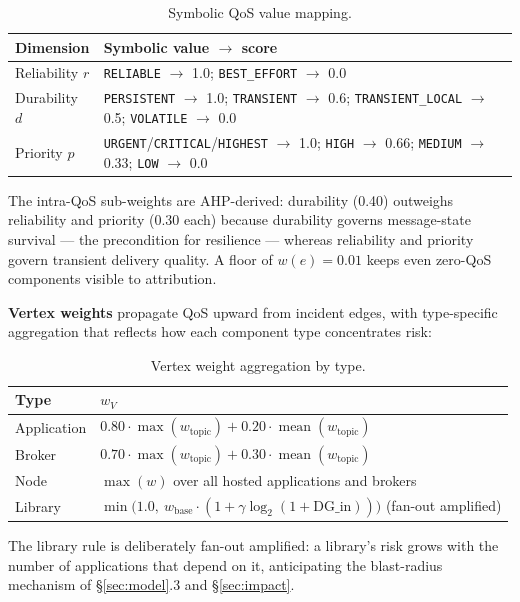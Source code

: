 \documentclass[review]{elsarticle}
\begin{document}
\begin{table}[h]
\centering
\caption{Symbolic QoS value mapping.}
\label{tab:qos}
\begin{tabular}{@{}p{3cm}p{9cm}@{}}
\toprule
Dimension & Symbolic value $\to$ score \\
\midrule
Reliability $r$ & \texttt{RELIABLE} $\to$ 1.0; \texttt{BEST\_EFFORT} $\to$ 0.0 \\
Durability $d$ & \texttt{PERSISTENT} $\to$ 1.0; \texttt{TRANSIENT} $\to$ 0.6; \texttt{TRANSIENT\_LOCAL} $\to$ 0.5; \texttt{VOLATILE} $\to$ 0.0 \\
Priority $p$ & \texttt{URGENT}/\texttt{CRITICAL}/\texttt{HIGHEST} $\to$ 1.0; \texttt{HIGH} $\to$ 0.66; \texttt{MEDIUM} $\to$ 0.33; \texttt{LOW} $\to$ 0.0 \\
\bottomrule
\end{tabular}
\end{table}

The intra-QoS sub-weights are AHP-derived: durability (0.40) outweighs reliability and priority
(0.30 each) because durability governs message-state survival --- the precondition for resilience
--- whereas reliability and priority govern transient delivery quality. A floor of $w(e) = 0.01$
keeps even zero-QoS components visible to attribution.

\textbf{Vertex weights} propagate QoS upward from incident edges, with type-specific aggregation
that reflects how each component type concentrates risk:

\begin{table}[h]
\centering
\caption{Vertex weight aggregation by type.}
\label{tab:vertexweights}
\begin{tabular}{@{}p{2.2cm}p{9.5cm}@{}}
\toprule
Type & $w_V$ \\
\midrule
Application & $0.80\cdot\max(w_{\text{topic}}) + 0.20\cdot\operatorname{mean}(w_{\text{topic}})$ \\
Broker & $0.70\cdot\max(w_{\text{topic}}) + 0.30\cdot\operatorname{mean}(w_{\text{topic}})$ \\
Node & $\max(w)$ over all hosted applications and brokers \\
Library & $\min\!\big(1.0,\ w_{\text{base}}\cdot(1 + \gamma\log_2(1 + \mathrm{DG\_in}))\big)$ (fan-out amplified) \\
\bottomrule
\end{tabular}
\end{table}

The library rule is deliberately fan-out amplified: a library's risk grows with the number of
applications that depend on it, anticipating the blast-radius mechanism of \S\ref{sec:model}.3 and
\S\ref{sec:impact}.
\end{document}
